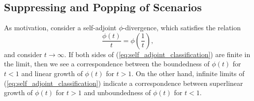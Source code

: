 \documentclass[ijoc,letterpaper]{informs3} %
\begin{document}
\subsection{Suppressing and Popping of Scenarios}
\label{ssec:suppressandpop}

As motivation, consider a self-adjoint $\phi$-divergence, which satisfies the relation
\begin{equation} \label{eq:self_adjoint_classification}
	\frac{\phi(t)}{t} = \phi\left(\frac{1}{t}\right),
\end{equation}
and consider $t \rightarrow \infty$.
If both sides of (\ref{eq:self_adjoint_classification}) are finite in the limit, then we see a correspondence between the boundedness of $\phi(t)$ for $t < 1$ and linear growth of $\phi(t)$ for $t > 1$.
On the other hand, infinite limits of (\ref{eq:self_adjoint_classification}) indicate a correspondence between superlinear growth of $\phi(t)$ for $t > 1$ and unboundedness of $\phi(t)$ for $t < 1$.
\end{document}
